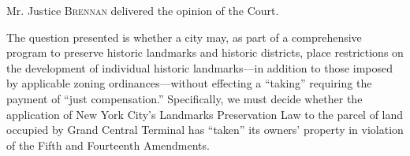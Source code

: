 

\opinion Mr. Justice \textsc{Brennan} delivered the opinion of the Court.

The question presented is whether a city may, as part of a comprehensive program
to preserve historic landmarks and historic districts, place restrictions on the
development of individual historic landmarks---in addition to those imposed by
applicable zoning ordinances---without effecting a ``taking'' requiring the
payment of ``just compensation.'' Specifically, we must decide whether the
application of New York City's Landmarks Preservation Law to the parcel of land
occupied by Grand Central Terminal has ``taken'' its owners' property in
violation of the Fifth and Fourteenth Amendments.






